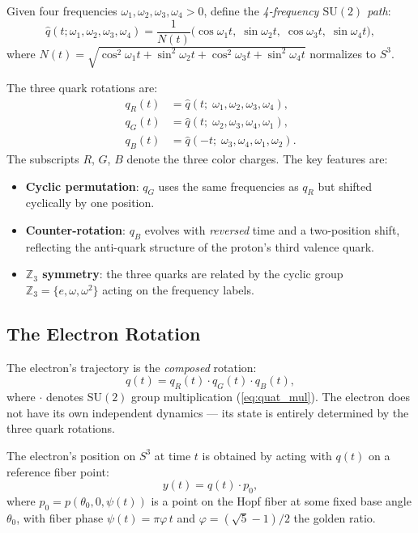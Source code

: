 \documentclass[12pt, a4paper]{article}
\theoremstyle{definition}
\theoremstyle{remark}
\newcommand{\Sthree}{S^3}
\newcommand{\SU}{\mathrm{SU}(2)}
\newcommand{\Z}{\mathbb{Z}}
\begin{document}
Given four frequencies $\omega_1, \omega_2, \omega_3, \omega_4 > 0$, define
the \emph{4-frequency $\SU$ path}:
\begin{equation}
  \hat{q}(t; \omega_1, \omega_2, \omega_3, \omega_4) =
  \frac{1}{N(t)}\bigl(\cos\omega_1 t,\; \sin\omega_2 t,\;
  \cos\omega_3 t,\; \sin\omega_4 t\bigr),
  \label{eq:su2_4freq}
\end{equation}
where $N(t) = \sqrt{\cos^2\omega_1 t + \sin^2\omega_2 t + \cos^2\omega_3 t
+ \sin^2\omega_4 t}$ normalizes to $\Sthree$.

The three quark rotations are:
\begin{align}
  q_R(t) &= \hat{q}(t;\; \omega_1, \omega_2, \omega_3, \omega_4),
  \label{eq:quark_R} \\
  q_G(t) &= \hat{q}(t;\; \omega_2, \omega_3, \omega_4, \omega_1),
  \label{eq:quark_G} \\
  q_B(t) &= \hat{q}(-t;\; \omega_3, \omega_4, \omega_1, \omega_2).
  \label{eq:quark_B}
\end{align}
The subscripts $R$, $G$, $B$ denote the three color charges. The key
features are:
\begin{itemize}[nosep]
  \item \textbf{Cyclic permutation}: $q_G$ uses the same frequencies as
    $q_R$ but shifted cyclically by one position.
  \item \textbf{Counter-rotation}: $q_B$ evolves with \emph{reversed} time
    and a two-position shift, reflecting the anti-quark structure of the
    proton's third valence quark.
  \item \textbf{$\Z_3$ symmetry}: the three quarks are related by the cyclic
    group $\Z_3 = \{e, \omega, \omega^2\}$ acting on the frequency labels.
\end{itemize}

\subsection{The Electron Rotation}

The electron's trajectory is the \emph{composed} rotation:
\begin{equation}
  q(t) = q_R(t) \cdot q_G(t) \cdot q_B(t),
  \label{eq:electron}
\end{equation}
where $\cdot$ denotes $\SU$ group multiplication
(\cref{eq:quat_mul}). The electron does not have its own independent
dynamics --- its state is entirely determined by the three quark rotations.

The electron's position on $\Sthree$ at time $t$ is obtained by acting with
$q(t)$ on a reference fiber point:
\begin{equation}
  y(t) = q(t) \cdot p_0,
  \label{eq:electron_pos}
\end{equation}
where $p_0 = p(\theta_0, 0, \psi(t))$ is a point on the Hopf fiber at some
fixed base angle $\theta_0$, with fiber phase
$\psi(t) = \pi\varphi\, t$ and $\varphi = (\sqrt{5}-1)/2$ the golden ratio.
\end{document}
